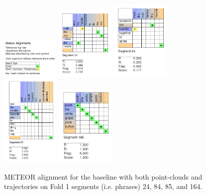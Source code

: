 \documentclass[letterpaper, 12 pt, conference]{ieeeconf}
\begin{document}
\begin{figure}[htb!]
  \centering
  \includegraphics[width=0.25\textwidth]{meteor_alignment_key}
  \includegraphics[width=0.25\textwidth]{baseline_w_traj_seg_24}
  \includegraphics[width=0.25\textwidth]{baseline_w_traj_seg_84}
  \includegraphics[width=0.25\textwidth]{baseline_w_traj_seg_85}
  \includegraphics[width=0.25\textwidth]{baseline_w_traj_seg_148}
  \caption{METEOR alignment for the baseline with both point-clouds and trajectories on Fold 1 segments (i.e. phrases) 24, 84, 85, and 164.}
  \label{fig:baseline_w_traj_fold_1}
\end{figure}
\end{document}
